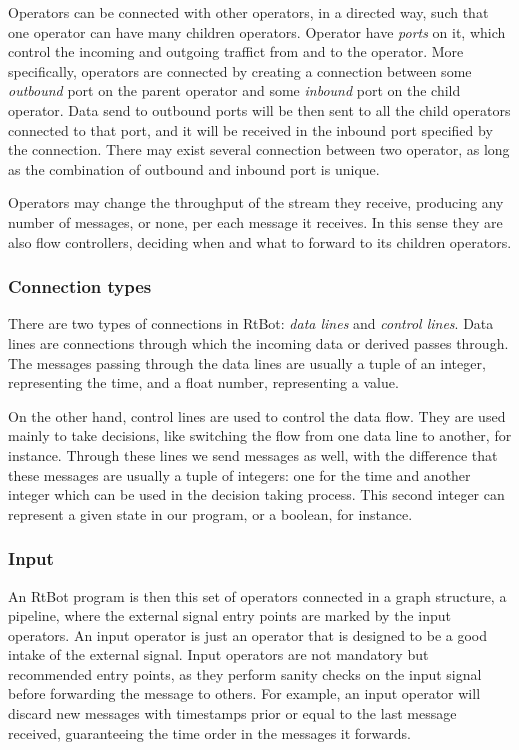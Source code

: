 \documentclass[preprint,1p,times]{elsarticle}
\begin{document}
Operators can be connected with other operators, in a directed way, such that one 
operator can have many children operators. Operator have \textit{ports} on it, which control
the incoming and outgoing traffict from and to the operator. More specifically, operators
are connected by creating a connection between some \textit{outbound} port on the parent
operator and some \textit{inbound} port on the child operator. Data send to outbound ports will be then
sent to all the child operators connected to that port, and it will be received in the inbound
port specified by the connection.
There may exist several connection between two operator, as long as
the combination of outbound and inbound port is unique.

Operators may change the throughput of the 
stream they receive, producing any number of messages, or none, per each message 
it receives. In this sense they are also flow controllers, deciding when and what 
to forward to its children operators.


\subsubsection{Connection types}
There are two types of connections in RtBot: \textit{data lines} and \textit{control lines}. 
Data lines are connections through which the incoming data or derived passes through. The messages
passing through the data lines are usually a tuple of an integer, representing the time, and a float
number, representing a value.

On the other hand, control lines are used to control the data flow. They are used mainly to take
decisions, like switching the flow from one data line to another, for instance.
Through these lines we send messages as well, with the difference that these messages are usually a tuple
of integers: one for the time and another integer which can be used in the decision taking process. This
second integer can represent a given state in our program, or a boolean, for instance.



\subsubsection{Input}
An RtBot program is then this set of operators connected in a graph structure, 
a pipeline, where the external signal entry points are marked by the input 
operators. An input operator is just an operator that is designed to be a good 
intake of the external signal. Input operators are not mandatory but recommended 
entry points, as they perform sanity checks on the input signal before forwarding 
the message to others. For example, an input operator will discard new messages 
with timestamps prior or equal to the last message received, guaranteeing the time 
order in the messages it forwards.
\end{document}
